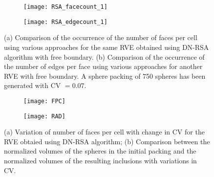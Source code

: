 \begin{figure}
	\centering
		\begin{subfigure}[b]{0.45\textwidth}
			\texttt{[image: RSA\_facecount\_1]}
			\caption{}\label{RSA_facecount}
		\end{subfigure}
		\begin{subfigure}[b]{0.45\textwidth}
			\texttt{[image: RSA\_edgecount\_1]}
			\caption{}\label{RSA_edgecount}
		\end{subfigure}
	\caption{(a) Comparison of the occurrence of the number of faces per cell using various approaches for the same RVE obtained using DN-RSA algorithm with free boundary. (b) Comparison of the occurrence of the number of edges per face using various approaches for another RVE with free boundary. A sphere packing of 750 spheres has been generated with CV $ = 0.07 $.}
\end{figure}

\begin{figure}
	\centering
	\begin{subfigure}[b]{0.45\textwidth}
		\texttt{[image: FPC]}
		\caption{}
	\end{subfigure}
	\begin{subfigure}[b]{0.45\textwidth}
		\texttt{[image: RAD]}
		\caption{}
	\end{subfigure}
	\caption{(a) Variation of number of faces per cell with change in CV for the RVE obtaied using DN-RSA algorithm; (b) Comparison between the normalized volumes of the spheres in the initial packing and the normalized volumes of the resulting inclusions with variations in CV.}\label{NF_CV}
\end{figure}

